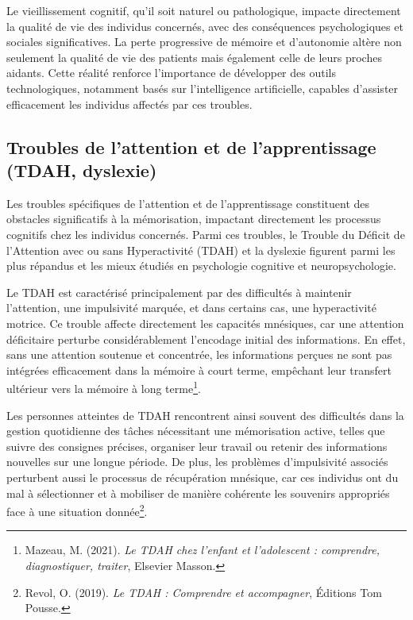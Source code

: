 \documentclass[11pt,a4paper]{report}
\begin{document}
Le vieillissement cognitif, qu’il soit naturel ou pathologique, impacte directement la qualité de vie des individus concernés, avec des conséquences psychologiques et sociales significatives. La perte progressive de mémoire et d’autonomie altère non seulement la qualité de vie des patients mais également celle de leurs proches aidants. Cette réalité renforce l’importance de développer des outils technologiques, notamment basés sur l’intelligence artificielle, capables d’assister efficacement les individus affectés par ces troubles.

\subsection{Troubles de l’attention et de l’apprentissage (TDAH, dyslexie)}

Les troubles spécifiques de l’attention et de l’apprentissage constituent des obstacles significatifs à la mémorisation, impactant directement les processus cognitifs chez les individus concernés. Parmi ces troubles, le Trouble du Déficit de l'Attention avec ou sans Hyperactivité (TDAH) et la dyslexie figurent parmi les plus répandus et les mieux étudiés en psychologie cognitive et neuropsychologie.

Le TDAH est caractérisé principalement par des difficultés à maintenir l’attention, une impulsivité marquée, et dans certains cas, une hyperactivité motrice. Ce trouble affecte directement les capacités mnésiques, car une attention déficitaire perturbe considérablement l'encodage initial des informations. En effet, sans une attention soutenue et concentrée, les informations perçues ne sont pas intégrées efficacement dans la mémoire à court terme, empêchant leur transfert ultérieur vers la mémoire à long terme\footnote{Mazeau, M. (2021). \textit{Le TDAH chez l'enfant et l'adolescent : comprendre, diagnostiquer, traiter}, Elsevier Masson.}.

Les personnes atteintes de TDAH rencontrent ainsi souvent des difficultés dans la gestion quotidienne des tâches nécessitant une mémorisation active, telles que suivre des consignes précises, organiser leur travail ou retenir des informations nouvelles sur une longue période. De plus, les problèmes d'impulsivité associés perturbent aussi le processus de récupération mnésique, car ces individus ont du mal à sélectionner et à mobiliser de manière cohérente les souvenirs appropriés face à une situation donnée\footnote{Revol, O. (2019). \textit{Le TDAH : Comprendre et accompagner}, Éditions Tom Pousse.}.
\end{document}
